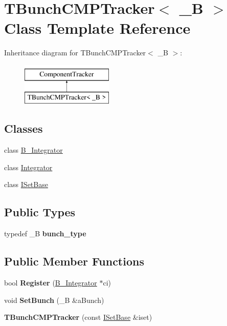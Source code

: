 \hypertarget{classTBunchCMPTracker}{}\section{T\+Bunch\+C\+M\+P\+Tracker$<$ \+\_\+B $>$ Class Template Reference}
\label{classTBunchCMPTracker}
Inheritance diagram for T\+Bunch\+C\+M\+P\+Tracker$<$ \+\_\+B $>$\+:\begin{figure}[H]
\begin{center}
\leavevmode
\includegraphics[height=2.000000cm]{classTBunchCMPTracker}
\end{center}
\end{figure}
\subsection*{Classes}
\begin{DoxyCompactItemize}
\item 
class \hyperlink{classTBunchCMPTracker_1_1B__Integrator}{B\+\_\+\+Integrator}
\item 
class \hyperlink{classTBunchCMPTracker_1_1Integrator}{Integrator}
\item 
class \hyperlink{classTBunchCMPTracker_1_1ISetBase}{I\+Set\+Base}
\end{DoxyCompactItemize}
\subsection*{Public Types}
\begin{DoxyCompactItemize}
\item 
\mbox{\label{classTBunchCMPTracker_aa5bb0f98caf336eedd09bfd0cff98014}} 
typedef \+\_\+B {\bfseries bunch\+\_\+type}
\end{DoxyCompactItemize}
\subsection*{Public Member Functions}
\begin{DoxyCompactItemize}
\item 
\mbox{\label{classTBunchCMPTracker_a5ccf93b18b4bfde9e8956520c95414b9}} 
bool {\bfseries Register} (\hyperlink{classTBunchCMPTracker_1_1B__Integrator}{B\+\_\+\+Integrator} $\ast$ci)
\item 
\mbox{\label{classTBunchCMPTracker_a6e53a5b0725937f2f84feb0fe97e20f7}} 
void {\bfseries Set\+Bunch} (\+\_\+B \&a\+Bunch)
\item 
\mbox{\label{classTBunchCMPTracker_ae5169e1bebb6a3339e411cfacbdeb7c6}} 
{\bfseries T\+Bunch\+C\+M\+P\+Tracker} (const \hyperlink{classTBunchCMPTracker_1_1ISetBase}{I\+Set\+Base} \&iset)
\end{DoxyCompactItemize}
